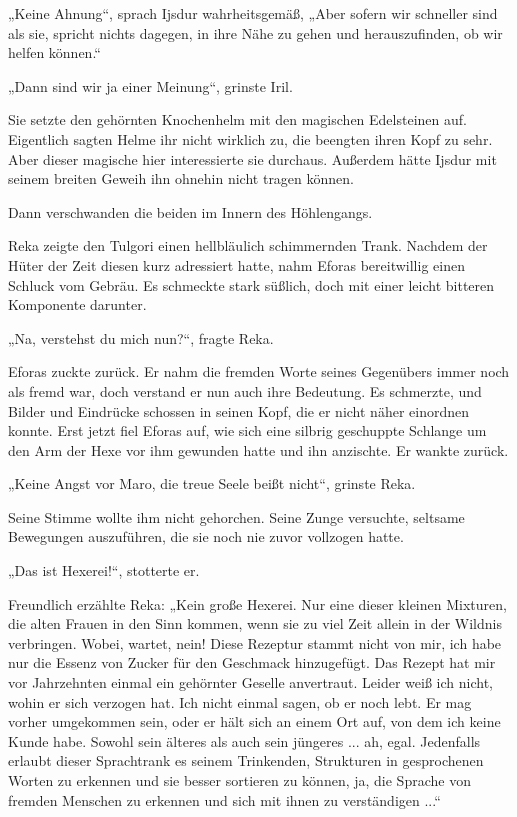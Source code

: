 „Keine Ahnung“, sprach Ijsdur wahrheitsgemäß, „Aber sofern wir schneller sind als sie, spricht nichts dagegen, in ihre Nähe zu gehen und herauszufinden, ob wir helfen können.“

„Dann sind wir ja einer Meinung“, grinste Iril.

Sie setzte den gehörnten Knochenhelm mit den magischen Edelsteinen auf. Eigentlich sagten Helme ihr nicht wirklich zu, die beengten ihren Kopf zu sehr. Aber dieser magische hier interessierte sie durchaus. Außerdem hätte Ijsdur mit seinem breiten Geweih ihn ohnehin nicht tragen können.

Dann verschwanden die beiden im Innern des Höhlengangs.\bigskip







Reka zeigte den Tulgori einen hellbläulich schimmernden Trank. Nachdem der Hüter der Zeit diesen kurz adressiert hatte, nahm Eforas bereitwillig einen Schluck vom Gebräu. Es schmeckte stark süßlich, doch mit einer leicht bitteren Komponente darunter.

„Na, verstehst du mich nun?“, fragte Reka.

Eforas zuckte zurück. Er nahm die fremden Worte seines Gegenübers immer noch als fremd war, doch verstand er nun auch ihre Bedeutung. Es schmerzte, und Bilder und Eindrücke schossen in seinen Kopf, die er nicht näher einordnen konnte. Erst jetzt fiel Eforas auf, wie sich eine silbrig geschuppte Schlange um den Arm der Hexe vor ihm gewunden hatte und ihn anzischte. Er wankte zurück.

„Keine Angst vor Maro, die treue Seele beißt nicht“, grinste Reka.

Seine Stimme wollte ihm nicht gehorchen. Seine Zunge versuchte, seltsame Bewegungen auszuführen, die sie noch nie zuvor vollzogen hatte.

„Das ist Hexerei!“, stotterte er.

Freundlich erzählte Reka: „Kein große Hexerei. Nur eine dieser kleinen Mixturen, die alten Frauen in den Sinn kommen, wenn sie zu viel Zeit allein in der Wildnis verbringen. Wobei, wartet, nein! Diese Rezeptur stammt nicht von mir, ich habe nur die Essenz von Zucker für den Geschmack hinzugefügt. Das Rezept hat mir vor Jahrzehnten einmal ein gehörnter Geselle anvertraut. Leider weiß ich nicht, wohin er sich verzogen hat. Ich nicht einmal sagen, ob er noch lebt. Er mag vorher umgekommen sein, oder er hält sich an einem Ort auf, von dem ich keine Kunde habe. Sowohl sein älteres als auch sein jüngeres ... ah, egal. Jedenfalls erlaubt dieser Sprachtrank es seinem Trinkenden, Strukturen in gesprochenen Worten zu erkennen und sie besser sortieren zu können, ja, die Sprache von fremden Menschen zu erkennen und sich mit ihnen zu verständigen ...“

